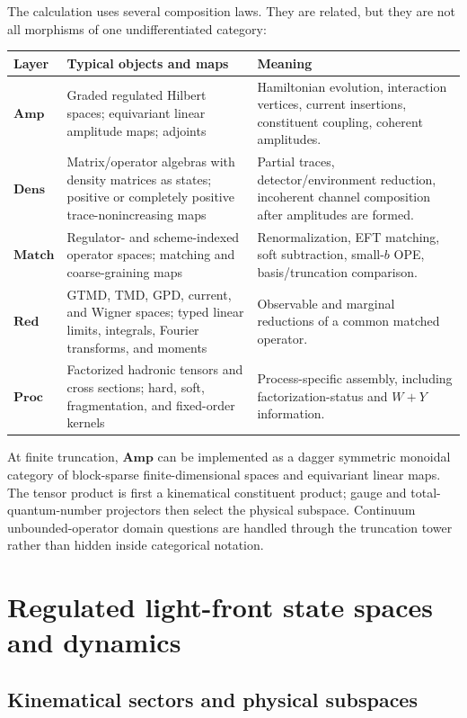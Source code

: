 \documentclass[11pt]{article}
\newcommand{\Amp}{\mathbf{Amp}}
\newcommand{\Dens}{\mathbf{Dens}}
\newcommand{\Match}{\mathbf{Match}}
\newcommand{\Red}{\mathbf{Red}}
\newcommand{\Proc}{\mathbf{Proc}}
\begin{document}
The calculation uses several composition laws.  They are related, but they
are not all morphisms of one undifferentiated category:
\begin{longtable}{L{0.16\textwidth}L{0.28\textwidth}L{0.46\textwidth}}
\toprule
Layer & Typical objects and maps & Meaning\\
\midrule
\endhead
\(\Amp\) & Graded regulated Hilbert spaces; equivariant linear amplitude
maps; adjoints & Hamiltonian evolution, interaction vertices, current
insertions, constituent coupling, coherent amplitudes.\\
\(\Dens\) & Matrix/operator algebras with density matrices as states; positive or completely
positive trace-nonincreasing maps & Partial traces, detector/environment
reduction, incoherent channel composition after amplitudes are formed.\\
\(\Match\) & Regulator- and scheme-indexed operator spaces; matching and
coarse-graining maps & Renormalization, EFT matching, soft subtraction,
small-\(b\) OPE, basis/truncation comparison.\\
\(\Red\) & GTMD, TMD, GPD, current, and Wigner spaces; typed linear limits,
integrals, Fourier transforms, and moments & Observable and marginal
reductions of a common matched operator.\\
\(\Proc\) & Factorized hadronic tensors and cross sections; hard, soft,
fragmentation, and fixed-order kernels & Process-specific assembly, including
factorization-status and \(W+Y\) information.\\
\bottomrule
\end{longtable}
At finite truncation, \(\Amp\) can be implemented as a dagger symmetric
monoidal category of block-sparse finite-dimensional spaces and equivariant
linear maps.  The tensor product is first a kinematical constituent product;
gauge and total-quantum-number projectors then select the physical subspace.
Continuum unbounded-operator domain questions are handled through the
truncation tower rather than hidden inside categorical notation.

\section{Regulated light-front state spaces and dynamics}
\label{sec:hilbert}

\subsection{Kinematical sectors and physical subspaces}
\end{document}

